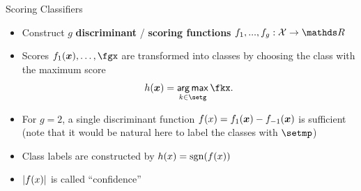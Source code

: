 \documentclass[11pt,compress,t,notes=noshow, xcolor=table]{beamer}
\begin{document}
\begin{vbframe}{Scoring Classifiers}
\begin{itemize}
\item Construct $g$ \textbf{discriminant} / \textbf{scoring functions} $f_1, ..., f_g: \Xspace \to \R$
\item Scores $f_1(\xv), \ldots, \fgx$ are transformed into classes by choosing the class with the maximum score 
$$
h(\xv) = \argmax_{k \in \setg} \fkx. 
$$ 

\item For $g = 2$, a single discriminant function $f(x) = f_{1}(\bm{x}) - f_{-1}(\bm{x})$ is sufficient (note that it would be natural here to label the classes with $\setmp$)  


\item Class labels are constructed by $h(x) = \text{sgn}(f(x))$
\item $|f(x)|$ is called \enquote{confidence}
\end{itemize}
\end{vbframe}
\end{document}
